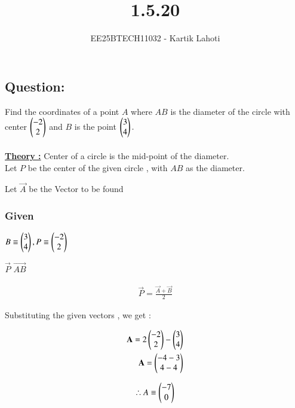 \documentclass[journal]{IEEEtran}
\numberwithin{equation}{enumi}
\numberwithin{figure}{enumi}
\begin{document}

\vspace{3cm}

\title{1.5.20}
\author{EE25BTECH11032 - Kartik Lahoti}
\maketitle

\subsection*{\textbf{Question:} } 
Find the coordinates of a point $A$ where $AB$ is the diameter of the circle with center $\myvec{-2\\2 }$ and $B$ is the point $\myvec{3\\4}.$\\
\solution \\ 

\underline{\textbf{Theory :}} Center of a circle is the mid-point of the diameter. \\

Let $P$ be the center of the given circle , with $AB$ as the diameter.

Let $\vec{A}$ be the Vector to be found 
\subsubsection*{Given }
 $B \equiv \myvec{3 \\ 4} , P \equiv \myvec{-2\\2}$ 
 
 $\vec{P}$  $\vec{AB}$ 

\begin{align}    
    \vec{P} = \frac{\vec{A} + \vec{B}}{2}  
\end{align}

Substituting the given vectors , we get : 

\begin{align}
    \vec{A} = 2\myvec{-2\\2} - \myvec{3 \\ 4} \\ 
    \vec{A} = \myvec{ -4 - 3\\ 4 - 4  }      
\end{align}

\begin{align*}
        \therefore A \equiv \myvec{-7\\0}
\end{align*}
\end{document}
